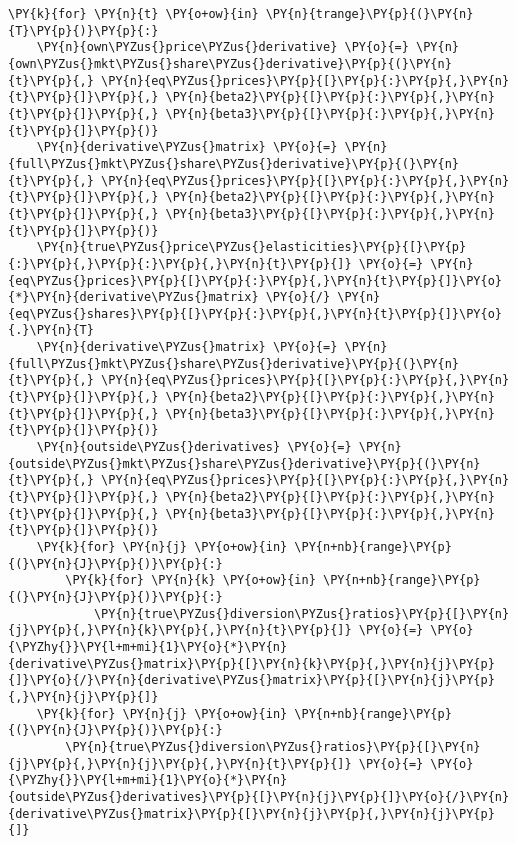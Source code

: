 \begin{tcolorbox}[breakable, size=fbox, boxrule=1pt, pad at break*=1mm,colback=cellbackground, colframe=cellborder]
\begin{Verbatim}[commandchars=\\\{\}]
\PY{k}{for} \PY{n}{t} \PY{o+ow}{in} \PY{n}{trange}\PY{p}{(}\PY{n}{T}\PY{p}{)}\PY{p}{:}
    \PY{n}{own\PYZus{}price\PYZus{}derivative} \PY{o}{=} \PY{n}{own\PYZus{}mkt\PYZus{}share\PYZus{}derivative}\PY{p}{(}\PY{n}{t}\PY{p}{,} \PY{n}{eq\PYZus{}prices}\PY{p}{[}\PY{p}{:}\PY{p}{,}\PY{n}{t}\PY{p}{]}\PY{p}{,} \PY{n}{beta2}\PY{p}{[}\PY{p}{:}\PY{p}{,}\PY{n}{t}\PY{p}{]}\PY{p}{,} \PY{n}{beta3}\PY{p}{[}\PY{p}{:}\PY{p}{,}\PY{n}{t}\PY{p}{]}\PY{p}{)}
    \PY{n}{derivative\PYZus{}matrix} \PY{o}{=} \PY{n}{full\PYZus{}mkt\PYZus{}share\PYZus{}derivative}\PY{p}{(}\PY{n}{t}\PY{p}{,} \PY{n}{eq\PYZus{}prices}\PY{p}{[}\PY{p}{:}\PY{p}{,}\PY{n}{t}\PY{p}{]}\PY{p}{,} \PY{n}{beta2}\PY{p}{[}\PY{p}{:}\PY{p}{,}\PY{n}{t}\PY{p}{]}\PY{p}{,} \PY{n}{beta3}\PY{p}{[}\PY{p}{:}\PY{p}{,}\PY{n}{t}\PY{p}{]}\PY{p}{)}
    \PY{n}{true\PYZus{}price\PYZus{}elasticities}\PY{p}{[}\PY{p}{:}\PY{p}{,}\PY{p}{:}\PY{p}{,}\PY{n}{t}\PY{p}{]} \PY{o}{=} \PY{n}{eq\PYZus{}prices}\PY{p}{[}\PY{p}{:}\PY{p}{,}\PY{n}{t}\PY{p}{]}\PY{o}{*}\PY{n}{derivative\PYZus{}matrix} \PY{o}{/} \PY{n}{eq\PYZus{}shares}\PY{p}{[}\PY{p}{:}\PY{p}{,}\PY{n}{t}\PY{p}{]}\PY{o}{.}\PY{n}{T}
    \PY{n}{derivative\PYZus{}matrix} \PY{o}{=} \PY{n}{full\PYZus{}mkt\PYZus{}share\PYZus{}derivative}\PY{p}{(}\PY{n}{t}\PY{p}{,} \PY{n}{eq\PYZus{}prices}\PY{p}{[}\PY{p}{:}\PY{p}{,}\PY{n}{t}\PY{p}{]}\PY{p}{,} \PY{n}{beta2}\PY{p}{[}\PY{p}{:}\PY{p}{,}\PY{n}{t}\PY{p}{]}\PY{p}{,} \PY{n}{beta3}\PY{p}{[}\PY{p}{:}\PY{p}{,}\PY{n}{t}\PY{p}{]}\PY{p}{)}
    \PY{n}{outside\PYZus{}derivatives} \PY{o}{=} \PY{n}{outside\PYZus{}mkt\PYZus{}share\PYZus{}derivative}\PY{p}{(}\PY{n}{t}\PY{p}{,} \PY{n}{eq\PYZus{}prices}\PY{p}{[}\PY{p}{:}\PY{p}{,}\PY{n}{t}\PY{p}{]}\PY{p}{,} \PY{n}{beta2}\PY{p}{[}\PY{p}{:}\PY{p}{,}\PY{n}{t}\PY{p}{]}\PY{p}{,} \PY{n}{beta3}\PY{p}{[}\PY{p}{:}\PY{p}{,}\PY{n}{t}\PY{p}{]}\PY{p}{)}
    \PY{k}{for} \PY{n}{j} \PY{o+ow}{in} \PY{n+nb}{range}\PY{p}{(}\PY{n}{J}\PY{p}{)}\PY{p}{:}
        \PY{k}{for} \PY{n}{k} \PY{o+ow}{in} \PY{n+nb}{range}\PY{p}{(}\PY{n}{J}\PY{p}{)}\PY{p}{:}
            \PY{n}{true\PYZus{}diversion\PYZus{}ratios}\PY{p}{[}\PY{n}{j}\PY{p}{,}\PY{n}{k}\PY{p}{,}\PY{n}{t}\PY{p}{]} \PY{o}{=} \PY{o}{\PYZhy{}}\PY{l+m+mi}{1}\PY{o}{*}\PY{n}{derivative\PYZus{}matrix}\PY{p}{[}\PY{n}{k}\PY{p}{,}\PY{n}{j}\PY{p}{]}\PY{o}{/}\PY{n}{derivative\PYZus{}matrix}\PY{p}{[}\PY{n}{j}\PY{p}{,}\PY{n}{j}\PY{p}{]}
    \PY{k}{for} \PY{n}{j} \PY{o+ow}{in} \PY{n+nb}{range}\PY{p}{(}\PY{n}{J}\PY{p}{)}\PY{p}{:}
        \PY{n}{true\PYZus{}diversion\PYZus{}ratios}\PY{p}{[}\PY{n}{j}\PY{p}{,}\PY{n}{j}\PY{p}{,}\PY{n}{t}\PY{p}{]} \PY{o}{=} \PY{o}{\PYZhy{}}\PY{l+m+mi}{1}\PY{o}{*}\PY{n}{outside\PYZus{}derivatives}\PY{p}{[}\PY{n}{j}\PY{p}{]}\PY{o}{/}\PY{n}{derivative\PYZus{}matrix}\PY{p}{[}\PY{n}{j}\PY{p}{,}\PY{n}{j}\PY{p}{]}
\end{Verbatim}
\end{tcolorbox}


